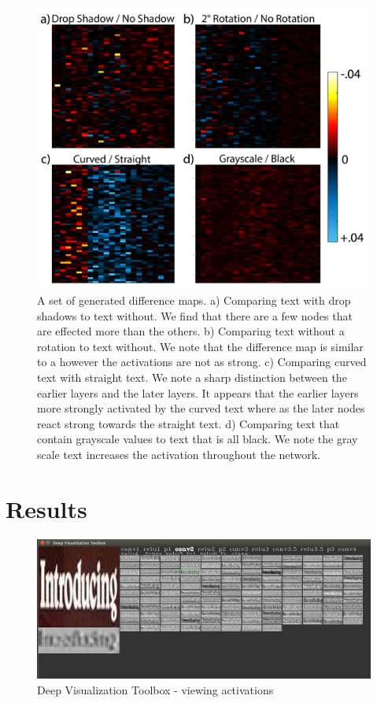 \documentclass[10pt,twocolumn,letterpaper]{article}
\begin{document}
\begin{figure}
\includegraphics[width=\columnwidth]{Figures/diff_examples/diff_examples-01.png}
\caption{A set of generated difference maps. a) Comparing text with drop shadows to text without. We find that there are a few nodes that are effected more than the others. b) Comparing text without a rotation to text without. We note that the difference map is similar to a however the activations are not as strong. c) Comparing curved text with straight text. We note a sharp distinction between the earlier layers and the later layers. It appears that the earlier layers more strongly activated by the curved text where as the later nodes react strong towards the straight text. d) Comparing text that contain grayscale values to text that is all black. We note the gray scale text increases the activation throughout the network.}
\label{fig:diffexamples}
\end{figure}

\section{Results}

\begin{figure}
\includegraphics[width=\columnwidth]{Figures/deepvis/deepvis-conv2.png}
\caption{Deep Visualization Toolbox - viewing activations}
\label{fig:deepvis}
\end{figure}
\end{document}
